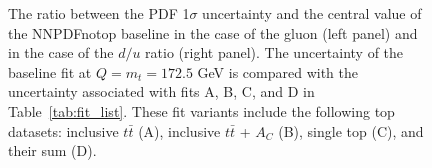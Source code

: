 \documentclass[withindex,glossary]{cam-thesis}
\begin{document}
\begin{figure}[H]
\centering
        \caption{The ratio between the PDF 1$\sigma$ uncertainty and the
          central value of the NNPDFnotop baseline in the case of the gluon
          (left panel) and in the case of the $d/u$ ratio (right panel).
          The uncertainty of  the  baseline fit at $Q=m_t=172.5$ GeV
          is compared with the uncertainty associated with fits A, B, C, and
          D in Table~\ref{tab:fit_list}.
          These fit variants include the following top datasets:  inclusive $t\bar{t}$ (A),
          inclusive $t\bar{t}$ + $A_C$ (B), single top (C), and their sum (D).}
\label{fig:fitABCD}
\end{figure}
\end{document}
